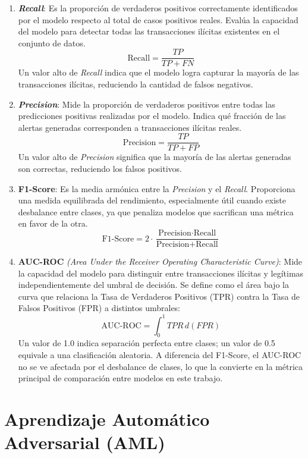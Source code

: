 \begin{enumerate}
    \item \textbf{\textit{Recall}}:
    Es la proporción de verdaderos positivos correctamente identificados por el modelo respecto al total de casos positivos reales. Evalúa la capacidad del modelo para detectar todas las transacciones ilícitas existentes en el conjunto de datos.
    \[
    \text{Recall} = \frac{TP}{TP + FN}
    \]
    Un valor alto de \textit{Recall} indica que el modelo logra capturar la mayoría de las transacciones ilícitas, reduciendo la cantidad de falsos negativos.

    \item \textbf{\textit{Precision}}:
    Mide la proporción de verdaderos positivos entre todas las predicciones positivas realizadas por el modelo. Indica qué fracción de las alertas generadas corresponden a transacciones ilícitas reales.
    \[
    \text{Precision} = \frac{TP}{TP + FP}
    \]
    Un valor alto de \textit{Precision} significa que la mayoría de las alertas generadas son correctas, reduciendo los falsos positivos.

    \item \textbf{F1-Score}:
    Es la media armónica entre la \textit{Precision} y el \textit{Recall}. Proporciona una medida equilibrada del rendimiento, especialmente útil cuando existe desbalance entre clases, ya que penaliza modelos que sacrifican una métrica en favor de la otra.
    \[
    \text{F1-Score} = 2 \cdot \frac{\text{Precision} \cdot \text{Recall}}{\text{Precision} + \text{Recall}}
    \]

    \item \textbf{AUC-ROC} \textit{(Area Under the Receiver Operating Characteristic Curve)}:
    Mide la capacidad del modelo para distinguir entre transacciones ilícitas y legítimas independientemente del umbral de decisión. Se define como el área bajo la curva que relaciona la Tasa de Verdaderos Positivos (TPR) contra la Tasa de Falsos Positivos (FPR) a distintos umbrales:
    \[
    \text{AUC-ROC} = \int_0^1 TPR \, d(FPR)
    \]
    Un valor de 1.0 indica separación perfecta entre clases; un valor de 0.5 equivale a una clasificación aleatoria. A diferencia del F1-Score, el AUC-ROC no se ve afectada por el desbalance de clases, lo que la convierte en la métrica principal de comparación entre modelos en este trabajo.
\end{enumerate}


\section{Aprendizaje Automático Adversarial (AML)}

